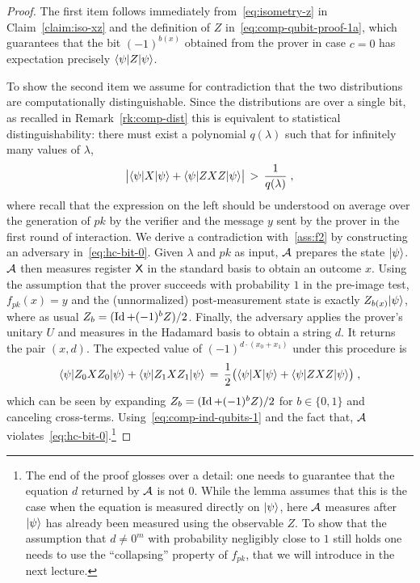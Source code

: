 \begin{proof}
The first item follows immediately from~\eqref{eq:isometry-z} in Claim~\ref{claim:iso-xz} and the definition of $Z$ in~\eqref{eq:comp-qubit-proof-1a}, which guarantees that  the bit $(-1)^{b(x)}$ obtained from the prover in case $c=0$ has expectation precisely $\langle\psi| Z |\psi\rangle$. 

To show the second item we assume for contradiction that the two distributions are computationally distinguishable. Since the distributions are over a single bit, as recalled in Remark~\ref{rk:comp-dist} this is equivalent to statistical distinguishability: there must exist a polynomial $q(\lambda)$ such that for infinitely many values of $\lambda$, 
\begin{equation}\label{eq:comp-ind-qubits-1}
 \big|\langle\psi| X |\psi\rangle +  \langle\psi| ZXZ |\psi\rangle\big| \,>\, \frac{1}{q(\lambda)}\;,
\end{equation}
where recall that the expression on the left should be understood on average over the generation of $pk$ by the verifier and the message $y$ sent by the prover in the first round of interaction. We derive a contradiction with~\ref{ass:f2} by constructing an adversary in~\eqref{eq:hc-bit-0}.  Given $\lambda$ and $pk$ as input, $\mathcal{A}$ prepares the state $|\psi\rangle$. $\mathcal{A}$ then measures register ${\textsf{X}}$ in the standard basis to obtain an outcome $x$. Using the assumption that the prover succeeds with probability $1$ in the pre-image test, $f_{pk}(x)=y$ and the (unnormalized) post-measurement state is exactly $Z_{b(x)}|\psi\rangle$, where as usual $Z_b = (\mathop{\rm Id}\nolimits + (-1)^b Z)/2$.  Finally, the adversary applies the prover's unitary $U$ and measures in the Hadamard basis to obtain a string $d$. It returns the pair $(x,d)$. The expected value of $(-1)^{d\cdot (x_0+x_1)}$ under this procedure is 
\[ \langle\psi| Z_0 X Z_0 |\psi\rangle + \langle\psi| Z_1 X Z_1 |\psi\rangle \,=\,\frac{1}{2}\big(\langle\psi| X |\psi\rangle +  \langle\psi| ZXZ |\psi\rangle\big)\;,\]
which can be seen by expanding $Z_b=(\mathop{\rm Id}\nolimits+(-1)^b Z)/2$ for $b\in \{0,1\}$ and canceling cross-terms. Using~\eqref{eq:comp-ind-qubits-1} and the fact that, $\mathcal{A}$ violates~\eqref{eq:hc-bit-0}.\footnote{The end of the proof glosses over a detail: one needs to guarantee that the equation $d$ returned by $\mathcal{A}$ is not $0$. While the lemma assumes that this is the case when the equation is measured directly on $|\psi\rangle$, here $\mathcal{A}$ measures after $|\psi\rangle$ has already been measured using the observable $Z$. To show that the assumption that $d\neq 0^m$ with probability negligibly close to $1$ still holds one needs to use the ``collapsing'' property of $f_{pk}$, that we will introduce in the next lecture.}
\end{proof}


